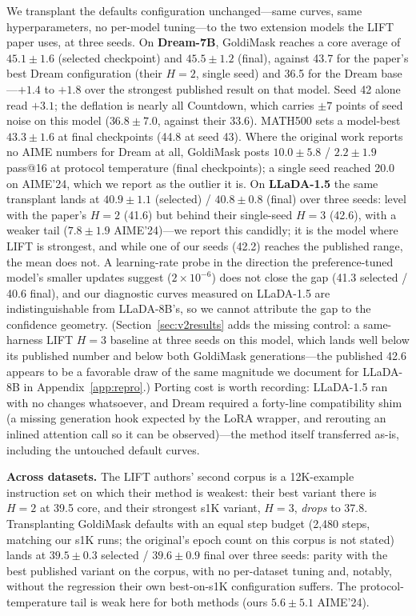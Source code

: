 \documentclass{article} %
\begin{document}
We transplant the defaults configuration unchanged---same curves, same hyperparameters, no per-model tuning---to the two extension models the LIFT paper uses, at three seeds. On \textbf{Dream-7B}, GoldiMask reaches a core average of $45.1 \pm 1.6$ (selected checkpoint) and $45.5 \pm 1.2$ (final), against 43.7 for the paper's best Dream configuration (their $H{=}2$, single seed) and 36.5 for the Dream base---$+1.4$ to $+1.8$ over the strongest published result on that model. Seed 42 alone read $+3.1$; the deflation is nearly all Countdown, which carries $\pm 7$ points of seed noise on this model ($36.8 \pm 7.0$, against their 33.6). MATH500 sets a model-best $43.3 \pm 1.6$ at final checkpoints (44.8 at seed 43). Where the original work reports no AIME numbers for Dream at all, GoldiMask posts $10.0 \pm 5.8$ / $2.2 \pm 1.9$ pass@16 at protocol temperature (final checkpoints); a single seed reached 20.0 on AIME'24, which we report as the outlier it is. On \textbf{LLaDA-1.5} the same transplant lands at $40.9 \pm 1.1$ (selected) / $40.8 \pm 0.8$ (final) over three seeds: level with the paper's $H{=}2$ (41.6) but behind their single-seed $H{=}3$ (42.6), with a weaker tail ($7.8 \pm 1.9$ AIME'24)---we report this candidly; it is the model where LIFT is strongest, and while one of our seeds (42.2) reaches the published range, the mean does not. A learning-rate probe in the direction the preference-tuned model's smaller updates suggest ($2 \times 10^{-6}$) does not close the gap (41.3 selected / 40.6 final), and our diagnostic curves measured on LLaDA-1.5 are indistinguishable from LLaDA-8B's, so we cannot attribute the gap to the confidence geometry. (Section~\ref{sec:v2results} adds the missing control: a same-harness LIFT $H{=}3$ baseline at three seeds on this model, which lands well below its published number and below both GoldiMask generations---the published 42.6 appears to be a favorable draw of the same magnitude we document for LLaDA-8B in Appendix~\ref{app:repro}.) Porting cost is worth recording: LLaDA-1.5 ran with no changes whatsoever, and Dream required a forty-line compatibility shim (a missing generation hook expected by the LoRA wrapper, and rerouting an inlined attention call so it can be observed)---the method itself transferred as-is, including the untouched default curves.

\textbf{Across datasets.} The LIFT authors' second corpus is a 12K-example instruction set on which their method is weakest: their best variant there is $H{=}2$ at 39.5 core, and their strongest s1K variant, $H{=}3$, \emph{drops} to 37.8. Transplanting GoldiMask defaults with an equal step budget (2{,}480 steps, matching our s1K runs; the original's epoch count on this corpus is not stated) lands at $39.5 \pm 0.3$ selected / $39.6 \pm 0.9$ final over three seeds: parity with the best published variant on the corpus, with no per-dataset tuning and, notably, without the regression their own best-on-s1K configuration suffers. The protocol-temperature tail is weak here for both methods (ours $5.6 \pm 5.1$ AIME'24).
\end{document}
